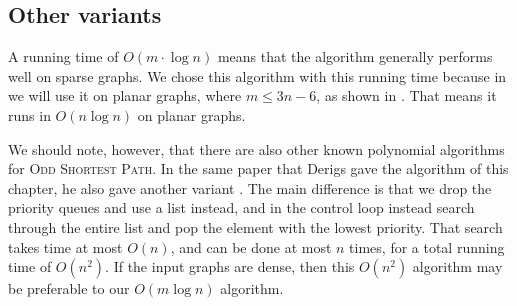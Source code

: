 \subsection{Other variants}
A running time of $O(m \cdot \log n)$ means that the algorithm generally performs well on sparse graphs. We chose this algorithm with this running time because in  we will use it on planar graphs, where $m \leq 3n-6$, as shown in . That means it runs in $O(n \log n)$ on planar graphs.

We should note, however, that there are also other known polynomial algorithms for \textsc{Odd Shortest Path}. In the same paper that Derigs gave the algorithm of this chapter, he also gave another variant \cite{source:derigs_shortest_odd_path}. The main difference is that we drop the priority queues and use a list instead, and in the control loop instead search through the entire list and pop the element with the lowest priority. That search takes time at most $O(n)$, and can be done at most $n$ times, for a total running time of $O(n^2)$. If the input graphs are dense, then this $O(n^2)$ algorithm may be preferable to our $O(m \log n)$ algorithm.



